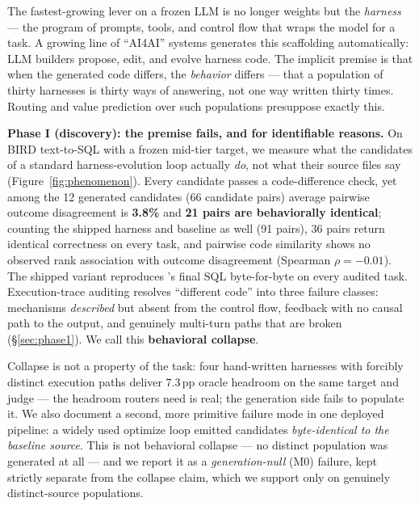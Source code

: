 The fastest-growing lever on a frozen LLM is no longer weights but the
\emph{harness} --- the program of prompts, tools, and control flow that wraps
the model for a task. A growing line of ``AI4AI'' systems generates this
scaffolding automatically: LLM builders propose, edit, and evolve harness code.
The implicit premise is that when the generated code differs, the
\emph{behavior} differs --- that a population of thirty harnesses is thirty
ways of answering, not one way written thirty times. Routing and value
prediction over such populations presuppose exactly this.

\textbf{Phase I (discovery): the premise fails, and for identifiable
reasons.} On BIRD text-to-SQL \citep{bird2021} with a frozen mid-tier target,
we measure what the candidates of a standard harness-evolution loop actually
\emph{do}, not what their source files say (Figure~\ref{fig:phenomenon}).
Every candidate passes a code-difference check, yet among the 12 generated
candidates (66 candidate pairs) average pairwise outcome disagreement is
\textbf{3.8\%} and \textbf{21 pairs are behaviorally identical}; counting the
shipped \react{} harness and \bare{} baseline as well (91 pairs), 36 pairs
return identical correctness on every task, and pairwise code similarity shows no
observed rank association with outcome disagreement (Spearman $\rho=-0.01$). The shipped
\react{} variant reproduces \bare's final SQL byte-for-byte on every audited
task. Execution-trace auditing resolves ``different code'' into three failure
classes: mechanisms \emph{described} but absent from the control flow,
feedback with no causal path to the output, and genuinely multi-turn paths
that are broken (\S\ref{sec:phase1}). We call this \textbf{behavioral
collapse}.

Collapse is not a property of the task: four hand-written harnesses with
forcibly distinct execution paths deliver 7.3\,pp oracle headroom on the same
target and judge --- the headroom routers need is real; the generation side
fails to populate it. We also document a second, more primitive failure mode
in one deployed pipeline: a widely used optimize loop emitted candidates
\emph{byte-identical to the baseline source}. This is not behavioral collapse
--- no distinct population was generated at all --- and we report it as a
\emph{generation-null} (M0) failure, kept strictly separate from the
collapse claim, which we support only on genuinely distinct-source
populations.

